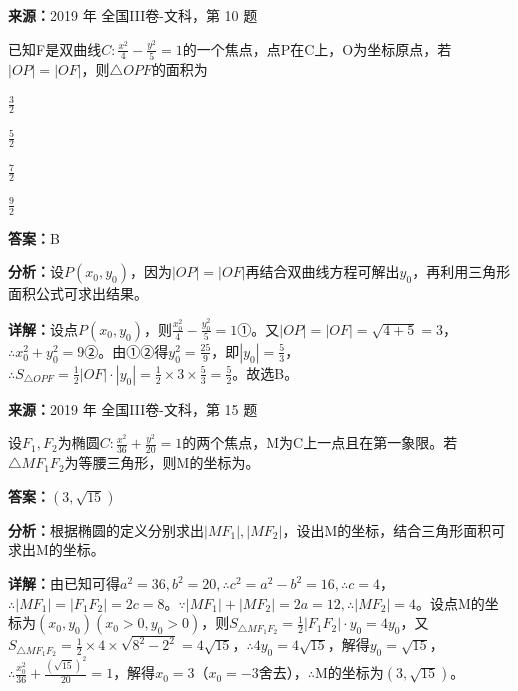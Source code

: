 \begin{question}[points=5]
\textbf{来源：}2019 年 全国III卷-文科，第 10 题\par
已知F是双曲线$C:\frac{x^2}{4}-\frac{y^2}{5}=1$的一个焦点，点P在C上，O为坐标原点，若$|OP|=|OF|$，则$\triangle OPF$的面积为
\begin{choices}
  \item $\frac{3}{2}$
  \item $\frac{5}{2}$
  \item $\frac{7}{2}$
  \item $\frac{9}{2}$
\end{choices}
\begin{solution}
\textbf{答案：}B

\textbf{分析：}设$P(x_0,y_0)$，因为$|OP|=|OF|$再结合双曲线方程可解出$y_0$，再利用三角形面积公式可求出结果。

\textbf{详解：}设点$P(x_0,y_0)$，则$\frac{x_0^2}{4}-\frac{y_0^2}{5}=1$①。又$|OP|=|OF|=\sqrt{4+5}=3$，$\therefore x_0^2+y_0^2=9$②。由①②得$y_0^2=\frac{25}{9}$，即$|y_0|=\frac{5}{3}$，$\therefore S_{\triangle OPF}=\frac{1}{2}|OF|\cdot|y_0|=\frac{1}{2}\times3\times\frac{5}{3}=\frac{5}{2}$。故选B。
\end{solution}
\end{question}

\begin{question}[points=5]
\textbf{来源：}2019 年 全国III卷-文科，第 15 题\par
设$F_1,F_2$为椭圆$C:\frac{x^2}{36}+\frac{y^2}{20}=1$的两个焦点，M为C上一点且在第一象限。若$\triangle MF_1F_2$为等腰三角形，则M的坐标为。
\fillin[{$(3,\sqrt{15})$}]
\begin{solution}
\textbf{答案：}$(3,\sqrt{15})$

\textbf{分析：}根据椭圆的定义分别求出$|MF_1|,|MF_2|$，设出M的坐标，结合三角形面积可求出M的坐标。

\textbf{详解：}由已知可得$a^2=36,b^2=20,\therefore c^2=a^2-b^2=16,\therefore c=4$，$\therefore |MF_1|=|F_1F_2|=2c=8$。$\because |MF_1|+|MF_2|=2a=12,\therefore |MF_2|=4$。设点M的坐标为$(x_0,y_0)(x_0>0,y_0>0)$，则$S_{\triangle MF_1F_2}=\frac{1}{2}|F_1F_2|\cdot y_0=4y_0$，又$S_{\triangle MF_1F_2}=\frac{1}{2}\times4\times\sqrt{8^2-2^2}=4\sqrt{15}$，$\therefore 4y_0=4\sqrt{15}$，解得$y_0=\sqrt{15}$，$\therefore \frac{x_0^2}{36}+\frac{(\sqrt{15})^2}{20}=1$，解得$x_0=3$（$x_0=-3$舍去），$\therefore$M的坐标为$(3,\sqrt{15})$。
\end{solution}
\end{question}

